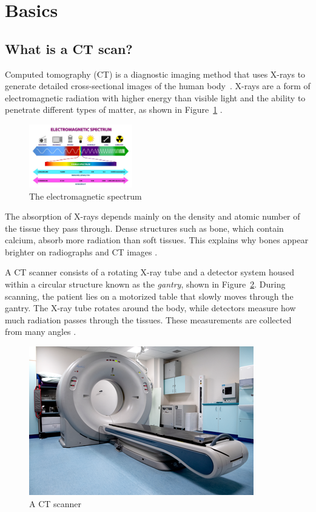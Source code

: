 \documentclass[12pt,a4paper]{article}
\begin{document}
\section{Basics}

\subsection{What is a CT scan?}
\label{what_is_ct}

Computed tomography (CT) is a diagnostic imaging method that uses X-rays to generate detailed cross-sectional images of the human body~\cite{nibib_ct}. X-rays are a form of electromagnetic radiation with higher energy than visible light and the ability to penetrate different types of matter, as shown in Figure~\ref{fig1} \cite{nibib_xray}. 

\begin{figure}[H]
    \centering
    \includegraphics[width=0.4\textwidth]{Bachelorthesis/UsedImages/fig1.jpg}
    \caption{The electromagnetic spectrum \cite{nibib_xray}}
    \label{fig1}
\end{figure}

The absorption of X-rays depends mainly on the density and atomic number of the tissue they pass through. Dense structures such as bone, which contain calcium, absorb more radiation than soft tissues. This explains why bones appear brighter on radiographs and CT images \cite{nibib_xray}. 

A CT scanner consists of a rotating X-ray tube and a detector system housed within a circular structure known as the \textit{gantry}, shown in Figure~\ref{fig2}. During scanning, the patient lies on a motorized table that slowly moves through the gantry. The X-ray tube rotates around the body, while detectors measure how much radiation passes through the tissues. These measurements are collected from many angles \cite{nibib_ct}. 


\begin{figure}[h!]
    \centering
    \includegraphics[width=0.5\linewidth]{Bachelorthesis//UsedImages/fig2.png}
    \caption{A CT scanner~\cite{cancerresearchuk_ctscan_fig}}
    \label{fig2}
\end{figure}
\end{document}
